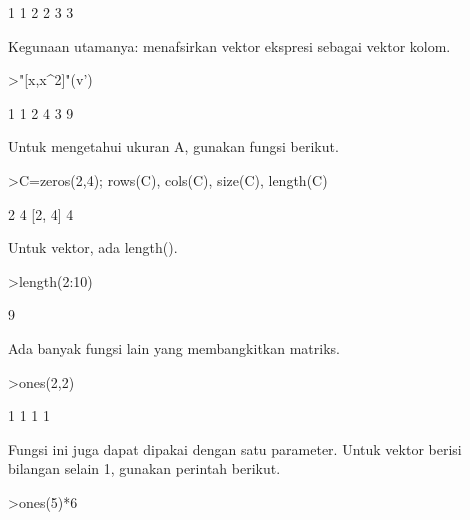 \documentclass[a4paper,10pt]{article}
\begin{document}
\begin{eulernotebook}
\begin{eulercomment}
\begin{eulercomment}
\begin{eulercomment}
\begin{eulercomment}
\begin{eulercomment}
\begin{eulercomment}
\begin{eulercomment}
\begin{eulercomment}
\begin{eulercomment}
\begin{eulercomment}
\begin{eulercomment}
\begin{eulercomment}
\begin{eulercomment}
\begin{eulercomment}
\begin{euleroutput}
              1             1 
              2             2 
              3             3 
\end{euleroutput}
\begin{eulercomment}
Kegunaan utamanya: menafsirkan vektor ekspresi sebagai vektor kolom.
\end{eulercomment}
\begin{eulerprompt}
>"[x,x^2]"(v')
\end{eulerprompt}
\begin{euleroutput}
              1             1 
              2             4 
              3             9 
\end{euleroutput}
\begin{eulercomment}
Untuk mengetahui ukuran A, gunakan fungsi berikut.
\end{eulercomment}
\begin{eulerprompt}
>C=zeros(2,4); rows(C), cols(C), size(C), length(C)
\end{eulerprompt}
\begin{euleroutput}
  2
  4
  [2,  4]
  4
\end{euleroutput}
\begin{eulercomment}
Untuk vektor, ada length().
\end{eulercomment}
\begin{eulerprompt}
>length(2:10)
\end{eulerprompt}
\begin{euleroutput}
  9
\end{euleroutput}
\begin{eulercomment}
Ada banyak fungsi lain yang membangkitkan matriks.
\end{eulercomment}
\begin{eulerprompt}
>ones(2,2)
\end{eulerprompt}
\begin{euleroutput}
              1             1 
              1             1 
\end{euleroutput}
\begin{eulercomment}
Fungsi ini juga dapat dipakai dengan satu parameter. Untuk vektor berisi
bilangan selain 1, gunakan perintah berikut.
\end{eulercomment}
\begin{eulerprompt}
>ones(5)*6
\end{eulerprompt}
\begin{euleroutput}
  [6,  6,  6,  6,  6]
\end{euleroutput}

\end{eulercomment}
\end{eulercomment}
\end{eulercomment}
\end{eulercomment}
\end{eulercomment}
\end{eulercomment}
\end{eulercomment}
\end{eulercomment}
\end{eulercomment}
\end{eulercomment}
\end{eulercomment}
\end{eulercomment}
\end{eulercomment}
\end{eulercomment}
\end{eulernotebook}
\end{document}
